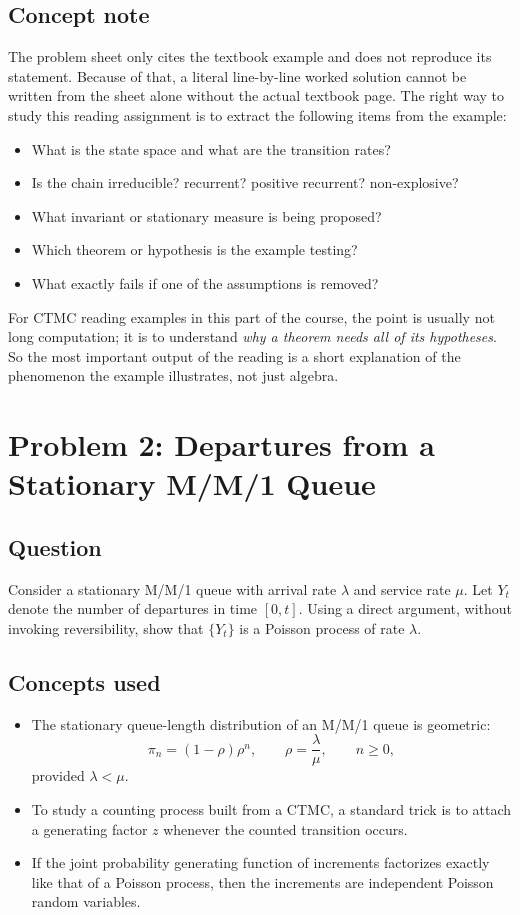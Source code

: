 \documentclass[11pt,a4paper]{article}
\newcommand{\1}{\mathbf{1}}
\begin{document}
\subsection*{Concept note}
The problem sheet only cites the textbook example and does not reproduce its statement. Because of that, a literal line-by-line worked solution cannot be written from the sheet alone without the actual textbook page. The right way to study this reading assignment is to extract the following items from the example:
\begin{itemize}
  \item What is the state space and what are the transition rates?
  \item Is the chain irreducible? recurrent? positive recurrent? non-explosive?
  \item What invariant or stationary measure is being proposed?
  \item Which theorem or hypothesis is the example testing?
  \item What exactly fails if one of the assumptions is removed?
\end{itemize}

For CTMC reading examples in this part of the course, the point is usually not long computation; it is to understand \emph{why a theorem needs all of its hypotheses}. So the most important output of the reading is a short explanation of the phenomenon the example illustrates, not just algebra.

\section{Problem 2: Departures from a Stationary M/M/1 Queue}
\subsection*{Question}
Consider a stationary M/M/1 queue with arrival rate $\lambda$ and service rate $\mu$. Let $Y_t$ denote the number of departures in time $[0,t]$. Using a direct argument, without invoking reversibility, show that $\{Y_t\}$ is a Poisson process of rate $\lambda$.

\subsection*{Concepts used}
\begin{itemize}
  \item The stationary queue-length distribution of an M/M/1 queue is geometric:
  \[
  \pi_n=(1-\rho)\rho^n,\qquad \rho=\frac{\lambda}{\mu},\qquad n\ge 0,
  \]
  provided $\lambda<\mu$.
  \item To study a counting process built from a CTMC, a standard trick is to attach a generating factor $z$ whenever the counted transition occurs.
  \item If the joint probability generating function of increments factorizes exactly like that of a Poisson process, then the increments are independent Poisson random variables.
\end{itemize}
\end{document}
